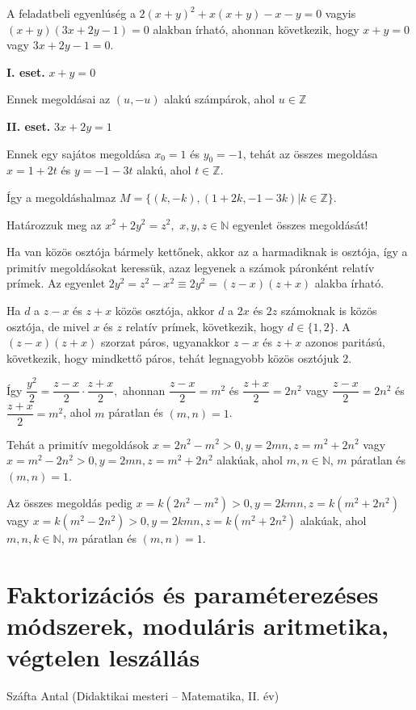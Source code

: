 \begin{solution}
A feladatbeli egyenlúség a $2(x+y)^{2}+x(x+y)-x-y=0$ vagyis $(x+y)(3x+2y-1)=0$
alakban írható, ahonnan következik, hogy $x+y=0$ vagy $3x+2y-1=0.$

\textbf{I. eset.} $x+y=0$

Ennek megoldásai az $(u,-u)$ alakú számpárok, ahol $u\in\mathbb{Z}$

\textbf{II. eset.} $3x+2y=1$

Ennek egy sajátos megoldása $x_{0}=1$ és $y_{0}=-1$, tehát az összes
megoldása $x=1+2t$ és $y=-1-3t$ alakú, ahol $t\in\mathbb{Z}.$

Így a megoldáshalmaz $M=\{(k,-k),(1+2k,-1-3k)|k\in\mathbb{Z}\}.$
\end{solution}
\begin{extraproblem}
Határozzuk meg az $x^{2}+2y^{2}=z^{2},$ $x,y,z\in\mathbb{N}$ egyenlet
összes megoldását! 
\end{extraproblem}

\begin{solution}
Ha van közös osztója bármely kettőnek, akkor az a harmadiknak is osztója,
így a primitív megoldásokat keressük, azaz legyenek a számok páronként
relatív prímek. Az egyenlet $2y^{2}=z^{2}-x^{2}\equiv2y^{2}=(z-x)(z+x)$
alakba írható.

Ha $d$ a $z-x$ és $z+x$ közös osztója, akkor $d$ a $2x$ és $2z$
számoknak is közös osztója, de mivel $x$ és $z$ relatív prímek,
következik, hogy $d\in\{1,2\}$. A $(z-x)(z+x)$ szorzat páros, ugyanakkor
$z-x$ és $z+x$ azonos paritású, következik, hogy mindkettő páros,
tehát legnagyobb közös osztójuk 2.

Így $\dfrac{y^{2}}{2}=\dfrac{z-x}{2}\cdot\dfrac{z+x}{2},$ ahonnan
$\dfrac{z-x}{2}=m^{2}$ és $\dfrac{z+x}{2}=2n^{2}$ vagy $\dfrac{z-x}{2}=2n^{2}$
és $\dfrac{z+x}{2}=m^{2}$, ahol $m$ páratlan és $(m,n)=1$.

Tehát a primitív megoldások $x=2n^{2}-m^{2}>0,y=2mn,z=m^{2}+2n^{2}$
vagy $x=m^{2}-2n^{2}>0,y=2mn,z=m^{2}+2n^{2}$ alakúak, ahol $m,n\in\mathbb{N}$,
$m$ páratlan és $(m,n)=1$.

Az összes megoldás pedig $x=k(2n^{2}-m^{2})>0,y=2kmn,z=k(m^{2}+2n^{2})$
vagy $x=k(m^{2}-2n^{2})>0,y=2kmn,z=k(m^{2}+2n^{2})$ alakúak, ahol
$m,n,k\in\mathbb{N}$, $m$ páratlan és $(m,n)=1$.
\end{solution}

\section{Faktorizációs és paraméterezéses módszerek, moduláris aritmetika, végtelen leszállás}\label{sec:vegtelen_leszallas}
\begin{description}
	{\large \item [{Szerző:}] Száfta Antal (Didaktikai mesteri -- Matematika, II. év) }
\end{description}


